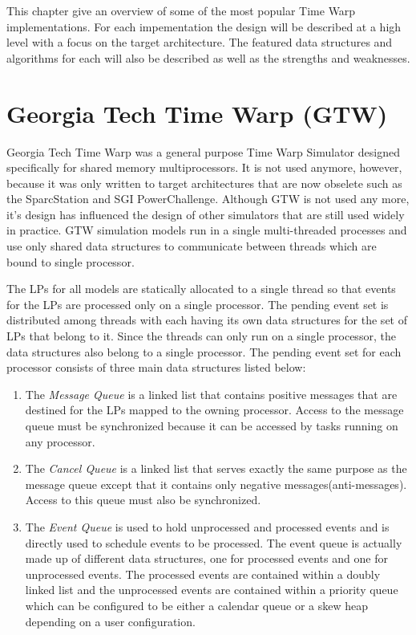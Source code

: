 \documentclass[11pt]{book}
\begin{document}
This chapter give an overview of some of the most popular Time Warp implementations.  For each
impementation the design will be described at a high level with a focus on the target
architecture.  The featured data structures and algorithms for each will also be described
as well as the strengths and weaknesses.

\section{Georgia Tech Time Warp (GTW)}

Georgia Tech Time Warp was a general purpose Time Warp Simulator designed specifically for
shared memory multiprocessors.  It is not used anymore, however, because it was only written
to target architectures that are now obselete such as the SparcStation and SGI PowerChallenge.
Although GTW is not used any more, it's design has influenced the design of other simulators that
are still used widely in practice.  GTW simulation models run in a single multi-threaded processes
and use only shared data structures to communicate between threads which are bound to single processor.

The LPs for all models are statically allocated to a single thread so that events for the
LPs are processed only on a single processor.  The pending event set is distributed among
threads with each having its own data structures for the set of LPs that belong to it.
Since the threads can only run on a single processor, the data structures also belong to a
single processor.  The pending event set for each processor consists of three main data structures
listed below\cite{das-94}:

\begin{enumerate}
    \item The \emph{Message Queue} is a linked list that contains positive messages that
        are destined for the LPs mapped to the owning processor.  Access to the message
        queue must be synchronized because it can be accessed by tasks running on any processor.
    \item The \emph{Cancel Queue} is a linked list that serves exactly the same purpose as
        the message queue except that it contains only negative messages(anti-messages).
        Access to this queue must also be synchronized.
    \item The \emph{Event Queue} is used to hold unprocessed and processed events and is
        directly used to schedule events to be processed.  The event queue is actually made
        up of different data structures, one for processed events and one for unprocessed
        events.  The processed events are contained within a doubly linked list and the
        unprocessed events are contained within a priority queue which can be configured to
        be either a calendar queue or a skew heap depending on a user configuration.
\end{enumerate}
\end{document}
